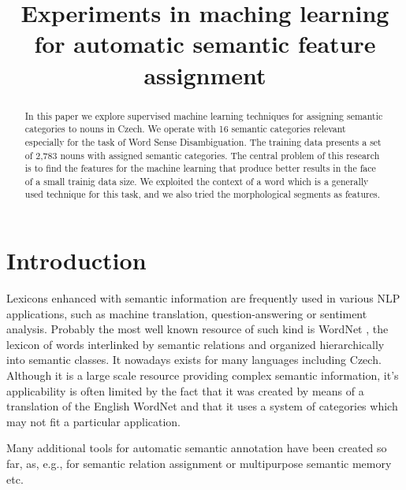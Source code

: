 \documentclass[letterpaper]{article}
\begin{document}
%

\title{Experiments in maching learning for automatic semantic feature assignment}
\maketitle
\begin{abstract}
In this paper we explore supervised machine learning techniques for
assigning semantic categories to nouns in Czech. We operate with 16 semantic categories 
relevant especially for the task of Word Sense Disambiguation. The training
data presents a set of 2,783 nouns with assigned semantic categories.   
The central problem of this research is to find the features for the machine learning 
that produce better results in the face of a small trainig data size. 
We exploited the context of a word which is a generally used technique for this task, 
and we also tried the morphological segments as features.

\end{abstract}


\section{Introduction}

Lexicons enhanced with semantic information are frequently used 
in various NLP applications, such as machine translation, question-answering
or sentiment analysis. Probably the most well known resource of such kind is 
WordNet \cite{wordnet}, the lexicon of words
interlinked by semantic relations and organized hierarchically into 
semantic classes. It nowadays exists for many languages including Czech. Although it is a large scale resource providing complex semantic information, it's applicability is often limited by the fact that it was created by means of a translation of the English WordNet and that it uses a system of categories which may not fit a particular application.

Many additional tools for automatic semantic annotation have been created so far, as, e.g., 
for semantic relation assignment \cite{peirsman} or multipurpose semantic memory \cite{baroni:2009} etc.  
 
\end{document}
